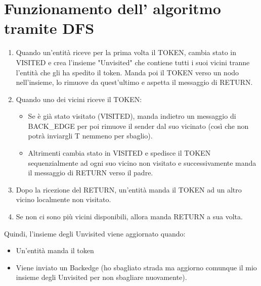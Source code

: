 \section{Funzionamento dell' algoritmo tramite DFS}
\begin{enumerate}
  \item Quando un'entità riceve per la prima volta il TOKEN, cambia stato in VISITED e crea l'insieme "Unvisited" che contiene tutti i suoi vicini tranne l'entità che gli ha spedito il token. Manda poi il TOKEN verso un nodo nell'insieme, lo rimuove da quest'ultimo e aspetta il messaggio di RETURN.
  \item Quando uno dei vicini riceve il TOKEN:
    \begin{itemize}
        \item Se è già stato visitato (VISITED), manda indietro un messaggio di BACK\_EDGE per poi rimuove il sender dal suo vicinato (così che non potrà inviargli T nemmeno per sbaglio).
        \item Altrimenti cambia stato in VISITED e spedisce il TOKEN sequenzialmente ad ogni suo vicino non visitato e successivamente manda il messaggio di RETURN verso il padre.
    \end{itemize} 
  \item Dopo la ricezione del RETURN, un'entità manda il TOKEN ad un altro vicino localmente non visitato.
  \item Se non ci sono più vicini disponibili, allora manda RETURN a sua volta.
\end{enumerate}

Quindi, l'insieme degli Unvisited viene aggiornato quando:
\begin{itemize}
    \item Un'entità manda il token
    \item Viene inviato un Backedge (ho sbagliato strada ma aggiorno comunque il mio insieme degli Unvisited per non sbagliare nuovamente).
\end{itemize}

